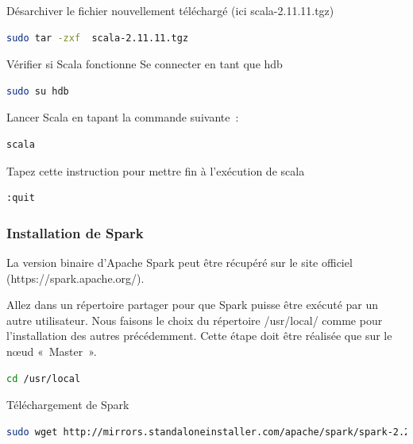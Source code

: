 \documentclass[12pt,english]{book}
\begin{document}
Désarchiver le fichier nouvellement téléchargé (ici scala-2.11.11.tgz)

\begin{lstlisting}[language=bash, frame=single, basicstyle=\footnotesize]
sudo tar -zxf  scala-2.11.11.tgz
\end{lstlisting}

Vérifier si Scala fonctionne
Se connecter en tant que hdb

\begin{lstlisting}[language=bash, frame=single, basicstyle=\footnotesize]
sudo su hdb
\end{lstlisting}

Lancer Scala en tapant la commande suivante :

\begin{lstlisting}[language=bash, frame=single, basicstyle=\footnotesize]
scala
\end{lstlisting}

Tapez cette instruction pour mettre fin à l'exécution de scala

\begin{lstlisting}[language=bash, frame=single, basicstyle=\footnotesize]
:quit
\end{lstlisting}

\subsubsection{Installation de Spark}

La version binaire d’Apache Spark peut être récupéré sur le site officiel (https://spark.apache.org/).

Allez dans un répertoire partager pour que Spark puisse être exécuté par un autre utilisateur.
Nous faisons le choix du répertoire /usr/local/ comme pour l’installation des autres précédemment.
Cette étape doit être réalisée que sur le nœud « Master ».

\begin{lstlisting}[language=bash, frame=single, basicstyle=\footnotesize]
cd /usr/local
\end{lstlisting}

Téléchargement de Spark

\begin{lstlisting}[language=bash, frame=single, basicstyle=\footnotesize, breaklines=true, postbreak=\mbox{\textcolor{red}{$\hookrightarrow$}\space}]
sudo wget http://mirrors.standaloneinstaller.com/apache/spark/spark-2.2.0/spark-2.2.0-bin-hadoop2.7.tgz
\end{lstlisting}
\end{document}
